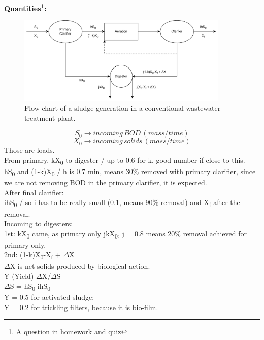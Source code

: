 \documentclass[12pt]{article}
\begin{document}
\textbf{Quantities\footnote{A question in homework and quiz}:}
\begin{figure}[ht] %
    \centering
    \includegraphics[width=0.9\textwidth]{SludgeQuantities.png}
    \caption{Flow chart of a sludge generation in a conventional wastewater treatment plant.}
    \label{fig:sludge}
\end{figure}
\[S_0 \rightarrow incoming\,BOD\,(mass/time)\]
\[X_0 \rightarrow incoming\,solids\,(mass/time)\]
Those are loads.\\
From primary, kX\textsubscript{0} to digester / up to 0.6 for k, good number if close to this.\\
hS\textsubscript{0} and (1-k)X\textsubscript{0} / h is 0.7 min, means 30\% removed with primary clarifier, since we are not removing BOD in the primary clarifier, it is expected.\\
After final clarifier:\\
ihS\textsubscript{0} / so i has to be really small (0.1, means 90\% removal) and X\textsubscript{f} after the removal.\\
Incoming to digesters:\\
1st: kX\textsubscript{0} came, as primary only jkX\textsubscript{0}, j = 0.8 means 20\% removal achieved for primary only.\\
2nd: (1-k)X\textsubscript{0}-X\textsubscript{f} + $\Delta$X\\
$\Delta$X is net solids produced by biological action.\\
Y (Yield) $\Delta$X/$\Delta$S\\
$\Delta$S = hS\textsubscript{0}-ihS\textsubscript{0}\\
Y = 0.5 for activated sludge;\\
Y = 0.2 for trickling filters, because it is bio-film.
\end{document}
